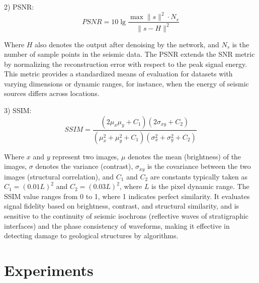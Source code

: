 \documentclass[preprint,12pt,authoryear]{elsarticle}
\begin{document}
2) PSNR:
\begin{equation}
PSNR = 10 \lg \frac{\max\|s\|^{2} \cdot N_s}{\|s - H\|^{2}} \tag{10}
\end{equation}

Where $H$ also denotes the output after denoising by the network, and $N_s$ is the number of sample points in the seismic data. The PSNR extends the SNR metric by normalizing the reconstruction error with respect to the peak signal energy. This metric provides a standardized means of evaluation for datasets with varying dimensions or dynamic ranges, for instance, when the energy of seismic sources differs across locations.

3) SSIM:
\begin{equation}
SSIM = \frac{(2\mu_{x}\mu_{y} + C_{1})(2\sigma_{xy} + C_{2})}{(\mu_{x}^{2} + \mu_{y}^{2} + C_{1})(\sigma_{x}^{2} + \sigma_{y}^{2} + C_{2})} \tag{11}
\end{equation}

Where $x$ and $y$ represent two images, $\mu$ denotes the mean (brightness) of the images, $\sigma$ denotes the variance (contrast), $\sigma_{xy}$ is the covariance between the two images (structural correlation), and $C_1$ and $C_2$ are constants typically taken as $C_1 = (0.01L)^2$ and $C_2 = (0.03L)^2$, where $L$ is the pixel dynamic range. The SSIM value ranges from 0 to 1, where 1 indicates perfect similarity. It evaluates signal fidelity based on brightness, contrast, and structural similarity, and is sensitive to the continuity of seismic isochrons (reflective waves of stratigraphic interfaces) and the phase consistency of waveforms, making it effective in detecting damage to geological structures by algorithms.

\section{Experiments}
\label{sec3}
\end{document}
